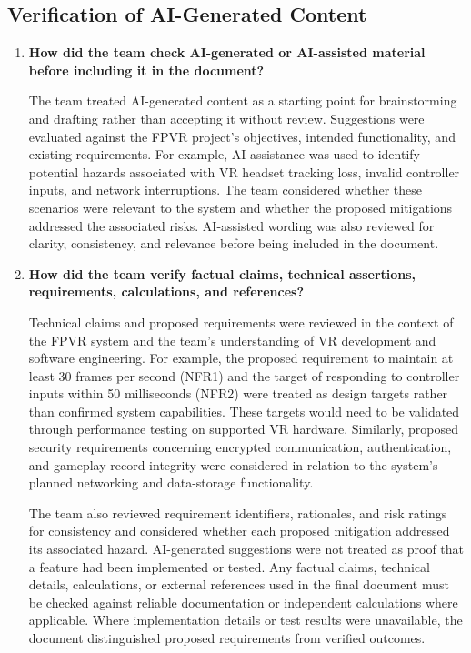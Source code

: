 \documentclass{article}
\begin{document}
\subsection{Verification of AI-Generated Content}

\begin{enumerate}
    \item \textbf{How did the team check AI-generated or AI-assisted material before including it in the document?}

    The team treated AI-generated content as a starting point for brainstorming and drafting rather than accepting it without review. Suggestions were evaluated against the FPVR project's objectives, intended functionality, and existing requirements. For example, AI assistance was used to identify potential hazards associated with VR headset tracking loss, invalid controller inputs, and network interruptions. The team considered whether these scenarios were relevant to the system and whether the proposed mitigations addressed the associated risks. AI-assisted wording was also reviewed for clarity, consistency, and relevance before being included in the document.

    \item \textbf{How did the team verify factual claims, technical assertions, requirements, calculations, and references?}

    Technical claims and proposed requirements were reviewed in the context of the FPVR system and the team's understanding of VR development and software engineering. For example, the proposed requirement to maintain at least 30 frames per second (NFR1) and the target of responding to controller inputs within 50 milliseconds (NFR2) were treated as design targets rather than confirmed system capabilities. These targets would need to be validated through performance testing on supported VR hardware. Similarly, proposed security requirements concerning encrypted communication, authentication, and gameplay record integrity were considered in relation to the system's planned networking and data-storage functionality.

    The team also reviewed requirement identifiers, rationales, and risk ratings for consistency and considered whether each proposed mitigation addressed its associated hazard. AI-generated suggestions were not treated as proof that a feature had been implemented or tested. Any factual claims, technical details, calculations, or external references used in the final document must be checked against reliable documentation or independent calculations where applicable. Where implementation details or test results were unavailable, the document distinguished proposed requirements from verified outcomes.


\end{enumerate}
\end{document}
